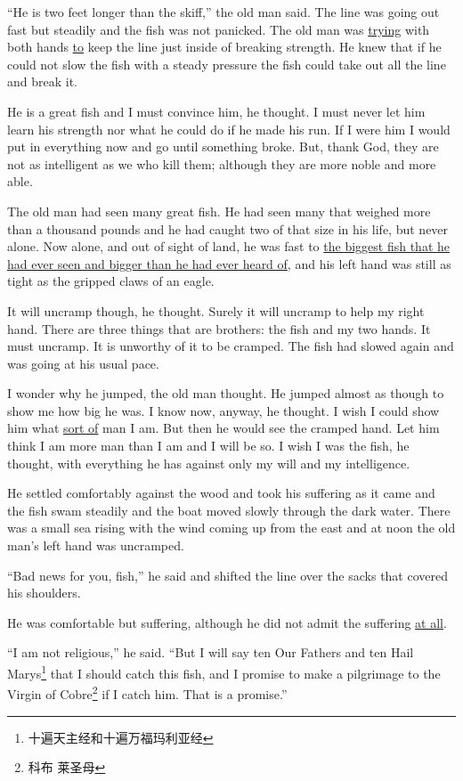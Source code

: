 \documentclass[fontset=ubuntu,zihao=-4]{ctexrep}
\begin{document}
``He is two feet longer than the skiff,'' the old man said. The line was
going out fast but steadily and the fish was not \gls{panicked}. The old man
was \uline{trying} with both hands \uline{to} keep the line just inside of
breaking strength. He knew that if he could not slow the fish with a steady
pressure the fish could take out all the line and break it.

He is a great fish and I must \gls{convince} him, he thought. I must never
let him learn his strength nor what he could do if he made his run. If I
were him I would put in everything now and go until something broke. But,
thank God, they are not as \gls{intelligent} as we who kill them; although
they are more \gls{noble} and more \gls{able}.

The old man had seen many great fish. He had seen many that weighed more
than a thousand pounds and he had caught two of that size in his life, but
never alone. Now alone, and out of sight of land, he was fast to \uline{the
  biggest fish that he had ever seen and bigger than he had ever heard of},
and his left hand was still as tight as the gripped claws of an eagle.

It will uncramp though, he thought. Surely it will uncramp to help my right
hand. There are three things that are brothers: the fish and my two hands.
It must uncramp. It is \gls{unworthy} of it to be cramped. The fish had slowed
again and was going at his \gls{usual} \gls{pace}.

I wonder why he jumped, the old man thought. He jumped almost as though to
show me how big he was. I know now, anyway, he thought. I wish I could show
him what \uline{sort of} man I am. But then he would see the cramped hand. Let him
think I am more man than I am and I will be so. I wish I was the fish, he
thought, with everything he has against only my will and my intelligence.

He settled comfortably against the wood and took his \gls{suffering} as it
came and the fish swam steadily and the boat moved slowly through the dark
water. There was a small sea rising with the wind coming up from the east
and at noon the old man's left hand was uncramped.

``Bad news for you, fish,'' he said and shifted the line over the sacks that
covered his shoulders.

He was comfortable but suffering, although he did not \gls{admit} the
suffering \uline{at all}.

``I am not \gls{religious},'' he said. ``But I will say ten Our Fathers and
ten Hail Marys\footnote{十遍天主经和十遍万福玛利亚经} that I should catch this fish,
and I promise to make a \gls{pilgrimage} to the Virgin of Cobre\footnote{科布
  莱圣母} if I catch him. That is a promise.''
\end{document}
